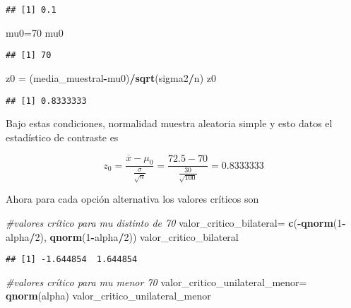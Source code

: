 \documentclass[
]{article}
\newenvironment{Shaded}{\begin{snugshade}}{\end{snugshade}}
\newcommand{\CommentTok}[1]{\textcolor[rgb]{0.56,0.35,0.01}{\textit{#1}}}
\newcommand{\DecValTok}[1]{\textcolor[rgb]{0.00,0.00,0.81}{#1}}
\newcommand{\KeywordTok}[1]{\textcolor[rgb]{0.13,0.29,0.53}{\textbf{#1}}}
\newcommand{\NormalTok}[1]{#1}
\newcommand{\OperatorTok}[1]{\textcolor[rgb]{0.81,0.36,0.00}{\textbf{#1}}}
\newcommand{\StringTok}[1]{\textcolor[rgb]{0.31,0.60,0.02}{#1}}
\begin{document}
\begin{verbatim}
## [1] 0.1
\end{verbatim}

\begin{Shaded}
\begin{Highlighting}[]
\NormalTok{mu0=}\DecValTok{70}
\NormalTok{mu0}
\end{Highlighting}
\end{Shaded}

\begin{verbatim}
## [1] 70
\end{verbatim}

\begin{Shaded}
\begin{Highlighting}[]
\NormalTok{z0 =}\StringTok{ }\NormalTok{(media_muestral}\OperatorTok{-}\NormalTok{mu0)}\OperatorTok{/}\KeywordTok{sqrt}\NormalTok{(sigma2}\OperatorTok{/}\NormalTok{n)}
\NormalTok{z0}
\end{Highlighting}
\end{Shaded}

\begin{verbatim}
## [1] 0.8333333
\end{verbatim}

Bajo estas condiciones, normalidad muestra aleatoria simple y esto datos
el estadístico de contraste es

\[z_0=\frac{\overline{x}-\mu_0}{\frac{\sigma}{\sqrt{n}}}=
\frac{72.5-70}{\frac{30}{\sqrt{100}}}
=0.8333333\]

Ahora para cada opción alternativa los valores críticos son

\begin{Shaded}
\begin{Highlighting}[]
\CommentTok{#valores crítico para mu  distinto de 70}
\NormalTok{valor_critico_bilateral=}\StringTok{ }\KeywordTok{c}\NormalTok{(}\OperatorTok{-}\KeywordTok{qnorm}\NormalTok{(}\DecValTok{1}\OperatorTok{-}\NormalTok{alpha}\OperatorTok{/}\DecValTok{2}\NormalTok{), }\KeywordTok{qnorm}\NormalTok{(}\DecValTok{1}\OperatorTok{-}\NormalTok{alpha}\OperatorTok{/}\DecValTok{2}\NormalTok{))}
\NormalTok{valor_critico_bilateral }
\end{Highlighting}
\end{Shaded}

\begin{verbatim}
## [1] -1.644854  1.644854
\end{verbatim}

\begin{Shaded}
\begin{Highlighting}[]
\CommentTok{#valores crítico para mu   menor  70}
\NormalTok{valor_critico_unilateral_menor=}\StringTok{ }\KeywordTok{qnorm}\NormalTok{(alpha)}
\NormalTok{valor_critico_unilateral_menor }
\end{Highlighting}
\end{Shaded}
\end{document}
